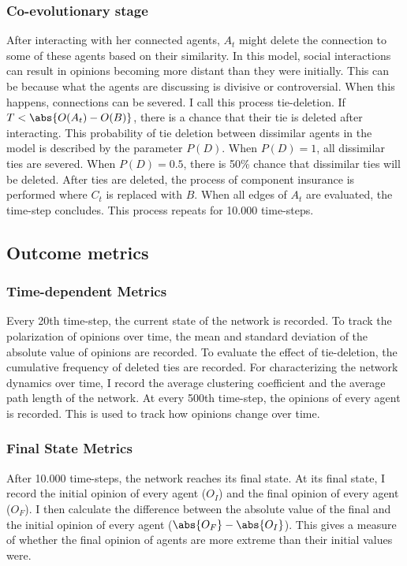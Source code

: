 \documentclass{article}
\DeclarePairedDelimiter{\abs}\lvert\rvert
\begin{document}
\subsubsection{Co-evolutionary stage}
After interacting with her connected agents, $A_t$ might delete the connection to some of these agents based on their similarity.
In this model, social interactions can result in opinions becoming more distant than they were initially. 
This can be because what the agents are discussing is divisive or controversial. When this happens, connections can be severed.
I call this process tie-deletion. 
If $T < \abs{O(A_t) - O(B)}$, there is a chance that their tie is deleted after interacting. This probability of tie deletion between dissimilar agents in the model is described by the parameter $P(D)$.
When $P(D) = 1$, all dissimilar ties are severed. When $P(D) = 0.5$, there is 50\% chance that dissimilar ties will be deleted. 
After ties are deleted, the process of component insurance is performed where $C_t$ is replaced with $B$.
When all edges of $A_t$ are evaluated, the time-step concludes. This process repeats for 10.000 time-steps.

\subsection{Outcome metrics} 

\subsubsection{Time-dependent Metrics}
Every 20th time-step, the current state of the network is recorded. 
To track the polarization of opinions over time,
the mean and standard deviation of the absolute value of opinions are recorded.
To evaluate the effect of tie-deletion, the cumulative frequency of deleted ties are recorded.
For characterizing the network dynamics over time, I record the average clustering coefficient and the average path length of the network.
At every 500th time-step, the opinions of every agent is recorded. This is used to track how opinions change over time.

\subsubsection{Final State Metrics}
After 10.000 time-steps, the network reaches its final state. 
At its final state, I record the initial opinion of every agent ($O_I$) and the final opinion of every agent ($O_F$). 
I then calculate the difference between the absolute value of the final and the initial opinion of every agent ($\abs{O_F} - \abs{O_I}$). This gives a measure of whether the final opinion of agents are more extreme than their initial values were. 
\end{document}
